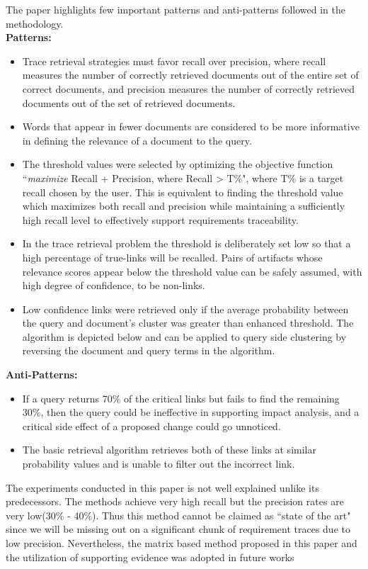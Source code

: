 \documentclass{report}
\begin{document}
The paper highlights few important patterns and anti-patterns followed in the methodology.\\

\textbf{Patterns:}
\begin{itemize}
\item Trace retrieval strategies must favor recall over precision, where recall measures the number of
correctly retrieved documents out of the entire set of correct documents, and precision measures the
number of correctly retrieved documents out of the set of retrieved documents.
\item Words that appear in fewer documents are considered to be more informative in defining the
relevance of a document to the query.
\item The threshold values were selected by optimizing the objective function ``\textit{maximize}
Recall + Precision, where Recall > T\%", where T\% is a target recall chosen by the user. This is
equivalent to finding the threshold value which maximizes both recall and precision while maintaining
a sufficiently high recall level to effectively support requirements traceability.
\item In the trace retrieval problem the threshold is deliberately set low so that a high percentage
of true-links will be recalled. Pairs of artifacts whose relevance scores appear below the threshold
value can be safely assumed, with high degree of confidence, to be non-links.
\item Low confidence links were retrieved only if the average probability between the query and
document's cluster was greater than enhanced threshold. The algorithm is depicted below and can be
applied to query side clustering by reversing the document and query terms in the algorithm.
\end{itemize}

\textbf{Anti-Patterns:}
\begin{itemize}
\item If a query returns 70\% of the critical links but fails to find the remaining 30\%, then the
query could be ineffective in supporting impact analysis, and a critical side effect of a proposed
change could go unnoticed.
\item The basic retrieval algorithm retrieves both of these links at similar probability values and is
unable to filter out the incorrect link.
\end{itemize}

The experiments conducted in this paper is not well explained unlike its predecessors. The methods 
achieve very high recall but the precision rates are very low(30\% - 40\%). Thus 
this method cannot be claimed as ``state of the art" since we will be missing out on a significant 
chunk of requirement traces due to low precision. Nevertheless, the matrix based method proposed in
this paper and the utilization of supporting evidence was adopted in future works 
\cite{gibiec10, falessi13}
 
\end{document}
